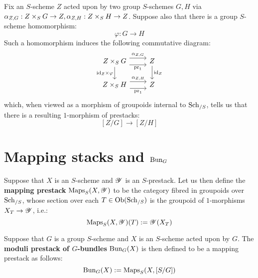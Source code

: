         \begin{remark}
            Fix an $S$-scheme $Z$ acted upon by two group $S$-schemes $G, H$ via $\alpha_{Z, G}: Z \x_S G \to Z, \alpha_{Z, H}: Z \x_S H \to Z$. Suppose also that there is a group $S$-scheme homomorphism:
                $$\varphi: G \to H$$
            Such a homomorphism induces the following commutative diagram:
                $$
                    \begin{tikzcd}
                	{Z \x_S G} & Z \\
                	{Z \x_S H} & Z
                	\arrow["{\pr_1}"', shift right=2, from=1-1, to=1-2]
                	\arrow["{\alpha_{Z, G}}", shift left=2, from=1-1, to=1-2]
                	\arrow["{\pr_1}"', shift right=2, from=2-1, to=2-2]
                	\arrow["{\alpha_{Z, H}}", shift left=2, from=2-1, to=2-2]
                	\arrow["{\id_Z \x \varphi}"', from=1-1, to=2-1]
                	\arrow["{\id_Z}", from=1-2, to=2-2]
                    \end{tikzcd}
                $$
            which, when viewed as a morphism of groupoids internal to $\mathrm{Sch}_{/S}$, tells us that there is a resulting $1$-morphism of prestacks:
                $$[Z/G] \to [Z/H]$$
        \end{remark}

    \section{Mapping stacks and \texorpdfstring{$\Bun_G$}{}}
        \begin{definition} \label{def: mapping_prestacks}
            Suppose that $X$ is an $S$-scheme and $\mathscr{Y}$ is an $S$-prestack. Let us then define the \textbf{mapping prestack} $\mathrm{Maps}_S(X, \mathscr{Y})$ to be the category fibred in groupoids over $\mathrm{Sch}_{/S}$, whose section over each $T \in \mathrm{Ob}(\mathrm{Sch}_{/S})$ is the groupoid of $1$-morphisms $X_T \to \mathscr{Y}$, i.e.:
                $$\mathrm{Maps}_S(X, \mathscr{Y})(T) := \mathscr{Y}(X_T)$$
        \end{definition}
        \begin{definition}[$\Bun_G$] \label{def: Bun_G}
            Suppose that $G$ is a group $S$-scheme and $X$ is an $S$-scheme acted upon by $G$. The \textbf{moduli prestack of $G$-bundles} $\mathrm{Bun}_G(X)$ is then defined to be a mapping prestack as follows:
                $$\mathrm{Bun}_G(X) := \mathrm{Maps}_S(X, [S/G])$$
        \end{definition}
    
    \printbibliography


